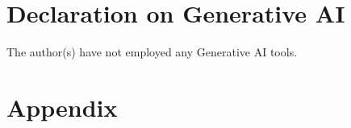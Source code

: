 \documentclass[]{ceurart}
\begin{document}
\section*{Declaration on Generative AI}

The author(s) have not employed any Generative AI tools.




\section{Appendix}

\appendix
\end{document}
